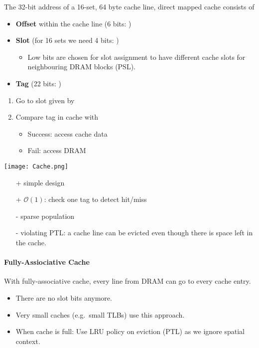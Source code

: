 \newpar{}

The 32-bit address of a 16-set, 64 byte cache line, direct mapped cache consists of
\begin{itemize}
    \item \textbf{Offset} within the cache line (6 bits: )
    \item \textbf{Slot} (for 16 sets we need 4 bits: )
    \begin{itemize}
        \item Low bits are chosen for slot assignment to have different cache slots for neighbouring DRAM blocks (PSL).
    \end{itemize}
    \item \textbf{Tag} (22 bits: )
\end{itemize}

\newpar{}

\begin{enumerate}
    \item Go to slot given by 
    \item Compare tag in cache with 
    \begin{itemize}
        \item Success: access cache data
        \item Fail: access DRAM
    \end{itemize}
\end{enumerate}

\texttt{[image: Cache.png]}
\newpar{}
\begin{itemize}
    \item[+] simple design
    \item[+] $\mathcal{O}(1)$: check one tag to detect hit/miss
    \item[-] sparse population
    \item[-] violating PTL: a cache line can be evicted even though there is space left in the cache.
\end{itemize}

\paragraph{Fully-Assiociative Cache}
With fully-associative cache, every line from DRAM can go to every cache entry. 
\begin{itemize}
    \item There are no slot bits anymore.
    \item Very small caches (e.g.\ small TLBs) use this approach.
    \item When cache is full: Use LRU policy on eviction (PTL) as we ignore spatial context.
\end{itemize}

